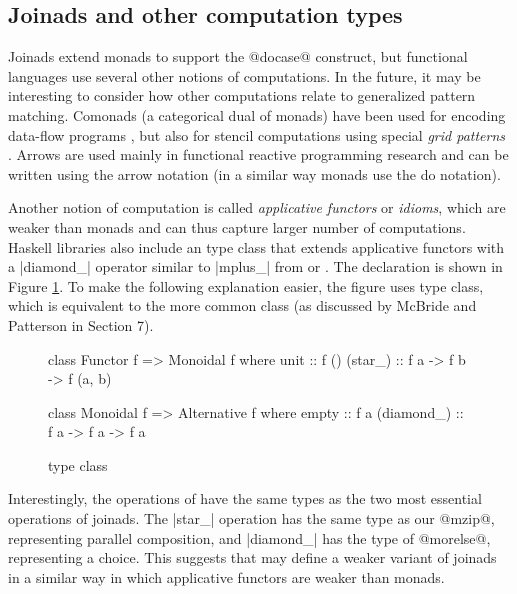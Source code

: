 \documentclass[preprint]{sigplanconf}
\begin{document}
\subsection{Joinads and other computation types}
Joinads extend monads to support the @docase@ construct, but functional languages use several other
notions of computations. In the future, it may be interesting to consider how other computations
relate to generalized pattern matching. Comonads (a categorical dual of monads) \cite{comonads-codata} 
have been used for encoding data-flow programs \cite{comonads-dataflow}, but also for stencil 
computations using special \textit{grid patterns} \cite{comomads-ypnos}. Arrows 
\cite{generalisingmonads, causalarr} are used mainly in functional reactive programming research 
\cite{arrows-frp} and can be written using the arrow notation \cite{arrows-notation} (in a similar 
way monads use the do notation).

Another notion of computation is called \textit{applicative functors} \cite{applicative} or 
\textit{idioms}, which are weaker than monads and can thus capture larger number of computations. 
Haskell libraries also include an  type class that extends applicative functors 
with a |diamond_| operator similar to |mplus_| from  or . The 
declaration is shown in Figure \ref{fig:alternative-typeclass}. To make the following explanation 
easier, the figure uses  type class, which is equivalent to the more common 
 class (as discussed by McBride and Patterson \cite{applicative} in Section 7). 

\begin{figure}
\begin{code}
class Functor f => Monoidal f where
  unit :: f ()
  (star_) :: f a -> f b -> f (a, b)

class Monoidal f => Alternative f where
  empty :: f a
  (diamond_) :: f a -> f a -> f a
\end{code}
\label{fig:alternative-typeclass}
\caption{ type class}
\end{figure}

Interestingly, the operations of  have the same types as the two most essential 
operations of joinads. The |star_| operation has the same type as our @mzip@, representing parallel 
composition, and |diamond_| has the type of @morelse@, representing a choice. This suggests that 
 may define a weaker variant of joinads in a similar way in which applicative 
functors are weaker than monads.
\end{document}
